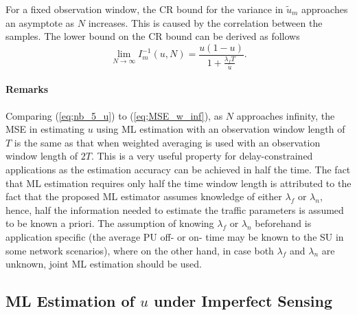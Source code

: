 \documentclass[11pt,draftclsnofoot,journal,onecolumn]{IEEEtran}
\begin{document}
For a fixed observation window, the CR bound for the variance in $\tilde{u}_m$ approaches an asymptote as $N$ increases. This is caused by the correlation between the samples. The lower bound on the CR bound can be derived as follows
\begin{equation}
\lim_{N\to\infty} I_m^{-1}\left(u,N\right) = \frac{u(1-u)}{1+\frac{\lambda_f T}{u}}.
\label{eq;nb_5_u}
\end{equation}
\paragraph*{Remarks}

Comparing (\ref{eq;nb_5_u}) to (\ref{eq;MSE_w_inf}), as $N$ approaches infinity, the MSE in estimating $u$ using ML estimation with an observation window length of $T$ is the same as that when weighted averaging is used with an observation window length of $2T$. This is a very useful property for delay-constrained applications as the estimation accuracy can be achieved in half the time. The fact that ML estimation requires only half the time window length is attributed to the fact that the proposed ML estimator assumes knowledge of either $\lambda_f$ or $\lambda_n$, hence, half the information needed to estimate the traffic parameters is assumed to be known a priori. The assumption of knowing $\lambda_f$ or $\lambda_n$ beforehand is application specific (the average PU off- or on- time may be known to the SU in some network scenarios), where on the other hand, in case both $\lambda_f$ and $\lambda_n$ are unknown, joint ML estimation should be used.

\subsection{ML Estimation of $u$ under Imperfect Sensing}
\label{sec:ml_u_se}
\end{document}
